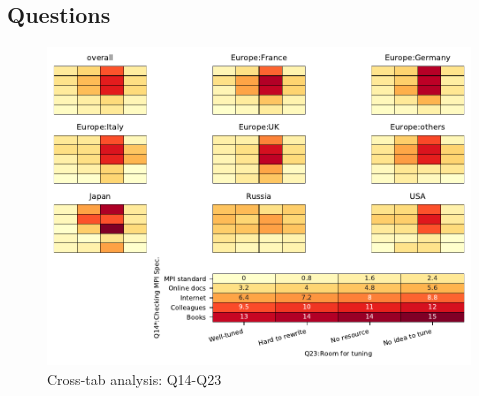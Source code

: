 
\subsection{Questions}


\begin{figure}
\begin{center}
\includegraphics[width=12cm]{../pdfs/Q14-Q23.pdf}
\caption{Cross-tab analysis: Q14-Q23}
\label{fig:Q14-Q23}
\end{center}
\end{figure}
